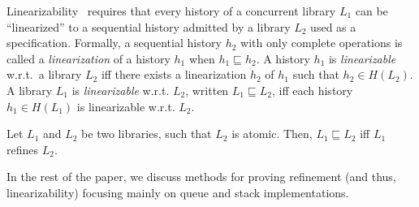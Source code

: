 
Linearizability~\cite{journals/toplas/HerlihyW90} requires that every history of a concurrent library $L_1$ can be 
``linearized'' to a sequential history admitted by a library $L_2$ used as a specification. 
Formally, a sequential history $h_2$ with only complete operations is called a \emph{linearization} of a history $h_1$ when $h_1 \sqsubseteq h_2$.
A history $h_1$ is \emph{linearizable} w.r.t.~a library $L_2$ if{f} there exists a linearization $h_2$ of $h_1$ such that 
$h_2 \in H(L_2)$. A library $L_1$
is \emph{linearizable} w.r.t. $L_2$, written $L_1 \sqsubseteq L_2$, if{f}
each history $h_1 \in H(L_1)$ is linearizable w.r.t. $L_2$.

\vspace{-1.5mm}
\begin{theorem}
Let $L_1$ and $L_2$ be two libraries, such that $L_2$ is atomic. Then, $L_1 \sqsubseteq L_2$ if{f} $L_1$ refines $L_2$.
\vspace{-1.5mm}
\end{theorem}

In the rest of the paper, we discuss methods for proving refinement (and thus, linearizability) focusing mainly on queue and stack implementations.

